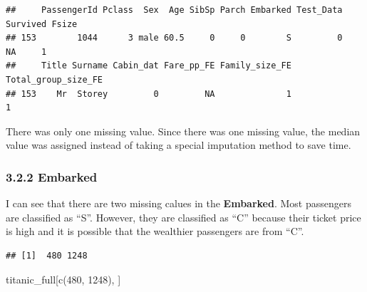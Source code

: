 \documentclass[
]{article}
\newenvironment{Shaded}{\begin{snugshade}}{\end{snugshade}}
\newcommand{\AttributeTok}[1]{\textcolor[rgb]{0.77,0.63,0.00}{#1}}
\newcommand{\DecValTok}[1]{\textcolor[rgb]{0.00,0.00,0.81}{#1}}
\newcommand{\FunctionTok}[1]{\textcolor[rgb]{0.00,0.00,0.00}{#1}}
\newcommand{\NormalTok}[1]{#1}
\newcommand{\OtherTok}[1]{\textcolor[rgb]{0.56,0.35,0.01}{#1}}
\newcommand{\SpecialCharTok}[1]{\textcolor[rgb]{0.00,0.00,0.00}{#1}}
\newcommand{\StringTok}[1]{\textcolor[rgb]{0.31,0.60,0.02}{#1}}
\begin{document}
\begin{verbatim}
##     PassengerId Pclass  Sex  Age SibSp Parch Embarked Test_Data Survived Fsize
## 153        1044      3 male 60.5     0     0        S         0       NA     1
##     Title Surname Cabin_dat Fare_pp_FE Family_size_FE Total_group_size_FE
## 153    Mr  Storey         0         NA              1                   1
\end{verbatim}

There was only one missing value. Since there was one missing value, the
median value was assigned instead of taking a special imputation method
to save time.

\begin{Shaded}
\end{Shaded}

\hypertarget{embarked-1}{%
\subsubsection{\texorpdfstring{\textbf{3.2.2
Embarked}}{3.2.2 Embarked}}\label{embarked-1}}

I can see that there are two missing calues in the \textbf{Embarked}.
Most passengers are classified as ``S''. However, they are classified as
``C'' because their ticket price is high and it is possible that the
wealthier passengers are from ``C''.

\begin{Shaded}
\end{Shaded}

\begin{verbatim}
## [1]  480 1248
\end{verbatim}

\begin{Shaded}
\begin{Highlighting}[]
\NormalTok{titanic\_full[}\FunctionTok{c}\NormalTok{(}\DecValTok{480}\NormalTok{, }\DecValTok{1248}\NormalTok{), ]}
\end{Highlighting}
\end{Shaded}
\end{document}
